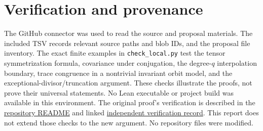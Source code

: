\documentclass[11pt]{article}
\newcommand{\src}[1]{\texttt{#1}}
\begin{document}
\section*{Verification and provenance}
The GitHub connector was used to read the source and proposal materials. The included TSV records relevant source paths and blob IDs, and the proposal file inventory. The exact finite examples in \src{check\_local.py} test the tensor symmetrization formula, covariance under conjugation, the degree-$q$ interpolation boundary, trace congruence in a nontrivial invariant orbit model, and the exceptional-divisor/truncation argument. These checks illustrate the proofs, not prove their universal statements. No Lean executable or project build was available in this environment. The original proof's verification is described in the \href{https://github.com/VladimirReshetnikov/ProveIt/blob/17bf37ab3b6740d5d7430065d2f2a1a2a03e8a0e/Analysis/GeneralizedRiemannHypothesis/Lean/grh/README.md}{repository README} and linked \href{https://math.mit.edu/~drew/shortgrh/}{independent verification record}. This report does not extend those checks to the new argument. No repository files were modified.
\end{document}
